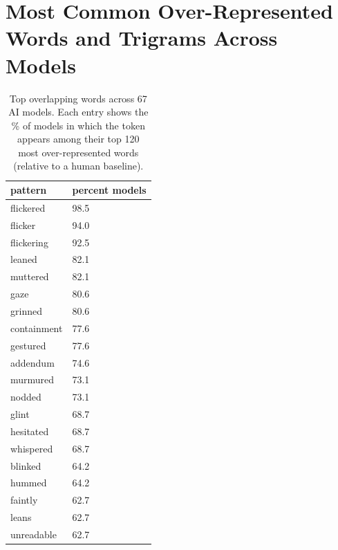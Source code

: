 \documentclass[11pt]{article}
\begin{document}
\section{Most Common Over-Represented Words and Trigrams Across Models}
\begin{table}[ht]
\centering
\begin{tabular}{ll}
\hline
\textbf{pattern} & \textbf{percent models} \\
\hline
flickered & 98.5 \\
flicker & 94.0 \\
flickering & 92.5 \\
leaned & 82.1 \\
muttered & 82.1 \\
gaze & 80.6 \\
grinned & 80.6 \\
containment & 77.6 \\
gestured & 77.6 \\
addendum & 74.6 \\
murmured & 73.1 \\
nodded & 73.1 \\
glint & 68.7 \\
hesitated & 68.7 \\
whispered & 68.7 \\
blinked & 64.2 \\
hummed & 64.2 \\
faintly & 62.7 \\
leans & 62.7 \\
unreadable & 62.7 \\
\hline
\end{tabular}
\caption{Top overlapping words across 67 AI models. Each entry shows the \% of models in which the token appears among their top 120 most over-represented words (relative to a human baseline).}
\label{tab:ai_overlap_words}
\end{table}
\end{document}
